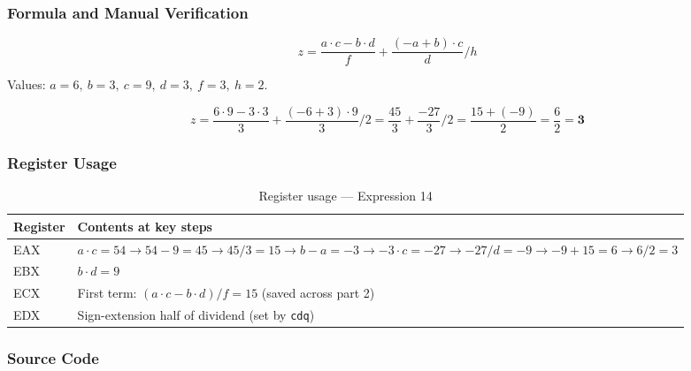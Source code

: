 \documentclass[12pt,a4paper]{article}
\begin{document}
\subsubsection{Formula and Manual Verification}

\[
z = \frac{a \cdot c - b \cdot d}{f} + \frac{(-a+b) \cdot c}{d} \bigg/ h
\]

Values: $a=6,\ b=3,\ c=9,\ d=3,\ f=3,\ h=2$.

\[
z = \frac{6 \cdot 9 - 3 \cdot 3}{3} + \frac{(-6+3) \cdot 9}{3} \bigg/ 2
  = \frac{45}{3} + \frac{-27}{3} \bigg/ 2
  = \frac{15 + (-9)}{2}
  = \frac{6}{2} = \mathbf{3}
\]

\subsubsection{Register Usage}

\begin{table}[H]
\centering
\caption{Register usage --- Expression 14}
\small
\begin{tabular}{|l|p{9cm}|}
\hline
\textbf{Register} & \textbf{Contents at key steps} \\
\hline
EAX & $a \cdot c = 54 \to 54 - 9 = 45 \to 45/3 = 15 \to b-a=-3 \to -3 \cdot c=-27 \to -27/d=-9 \to -9+15=6 \to 6/2=3$ \\
\hline
EBX & $b \cdot d = 9$ \\
\hline
ECX & First term: $(a \cdot c - b \cdot d)/f = 15$ (saved across part 2) \\
\hline
EDX & Sign-extension half of dividend (set by \texttt{cdq}) \\
\hline
\end{tabular}
\end{table}

\subsubsection{Source Code}
\end{document}
